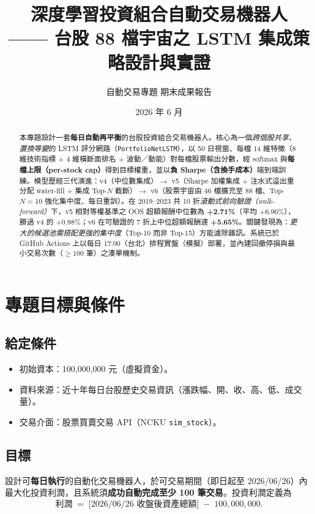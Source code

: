 \documentclass[11pt, fontset=none]{ctexart}
\title{\textbf{深度學習投資組合自動交易機器人\\—— 台股 88 檔宇宙之 LSTM 集成策略設計與實證}}
\author{自動交易專題 期末成果報告}
\date{2026 年 6 月}
\begin{document}
\maketitle

\begin{abstract}
  \noindent
  本專題設計一套\textbf{每日自動再平衡}的台股投資組合交易機器人。核心為一個\emph{跨個股共享、置換等變}的 LSTM 評分網路（\texttt{PortfolioNetLSTM}），以 50 日視窗、每檔 14 維特徵（8 維技術指標 + 4 維橫斷面排名 + 波動／動能）對每檔股票輸出分數，經 softmax 與\textbf{每檔上限（per-stock cap）}得到目標權重，並以\textbf{負 Sharpe（含換手成本）}端到端訓練。模型歷經三代演進：v4（中位數集成）$\rightarrow$ v5（Sharpe 加權集成 + 注水式溢出重分配 water-fill + 集成 Top-$N$ 截斷）$\rightarrow$ v6（股票宇宙由 46 檔擴充至 88 檔、Top-$N=10$ 強化集中度、每日重訓）。在 2019–2023 共 10 折\emph{滾動式前向驗證（walk-forward）}下，v5 相對等權基準之 OOS 超額報酬中位數為 \textbf{+2.71\%}（平均 +6.96\%），勝過 v4 的 +0.98\%；v6 在可驗證的 7 折上中位超額報酬達 \textbf{+5.65\%}。關鍵發現為：\emph{更大的候選池需搭配更強的集中度}（Top-10 而非 Top-15）方能濾除雜訊。系統已於 GitHub Actions 上以每日 17:00（台北）排程實盤（模擬）部署，並內建回撤停損與最小交易次數（$\geq 100$ 筆）之湊單機制。
\end{abstract}

\section{專題目標與條件}

\subsection{給定條件}
\begin{itemize}[leftmargin=2em]
  \item 初始資本：100{,}000{,}000 元（虛擬資金）。
  \item 資料來源：近十年每日台股歷史交易資訊（漲跌幅、開、收、高、低、成交量）。
  \item 交易介面：股票買賣交易 API（NCKU \texttt{sim\_stock}）。
\end{itemize}

\subsection{目標}
設計可\textbf{每日執行}的自動化交易機器人，於可交易期間（即日起至 2026/06/26）內最大化投資利潤，且系統須\textbf{成功自動完成至少 100 筆交易}。投資利潤定義為
\[
  \text{利潤} \;=\; \big[\text{2026/06/26 收盤後資產總額}\big] \;-\; 100{,}000{,}000.
\]
\end{document}
